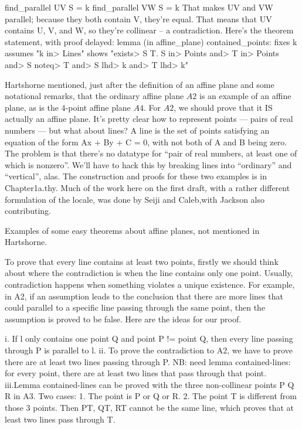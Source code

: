 \begin{isabellebody}
\begin{isamarkuptext}
find_parallel UV S = k
find_parallel VW S = k
That makes UV and VW parallel; because they both contain V, they're equal. That means that UV contains 
U, V, and W, so they're collinear -- a contradiction. 
Here's the theorem statement, with proof delayed:
lemma (in affine_plane) contained_points: 
  fixes k
  assumes "k \<in> Lines"
  shows "\<exists> S T. S \<in> Points \<and> T \<in> Points \<and>  S \<noteq> T \<and>  S \<lhd> k \<and>  T \<lhd> k"%
\end{isamarkuptext}\isamarkuptrue%
%
\isadelimdocument
%
\endisadelimdocument
%
\isatagdocument
%
\isamarkuptrue%
%
\endisatagdocument
{\isafolddocument}%
%
\isadelimdocument
%
\endisadelimdocument
%
\begin{isamarkuptext}%
Hartshorne mentioned, just after the definition of an affine plane and some notational
remarks, that the ordinary affine plane $A2$ is an example of an affine plane, as is the 4-point
affine plane $A4$. For $A2$, we should prove 
that it IS actually an affine plane. It's pretty clear how to represent points --- pairs of real 
numbers --- but what about lines? A line is the set of points satisfying an equation of 
the form Ax + By + C = 0, with not both of A and B being zero. The problem is that there's 
no datatype for ``pair of real numbers, at least one of which is nonzero''. We'll have 
to hack this by breaking lines into ``ordinary'' and ``vertical'', alas.  The construction
and proofs for these two examples is in Chapter1a.thy. Much of the work here 
on the first draft, with a rather different formulation of the locale, was done by Seiji and Caleb,with Jackson 
also contributing.%
\end{isamarkuptext}\isamarkuptrue%
%
\begin{isamarkuptext}%
\done \done  Examples of some easy theorems about affine planes, not mentioned in Hartshorne.
\jackson%
\end{isamarkuptext}\isamarkuptrue%
%
\begin{isamarkuptext}%
To prove that every line contains at least two points, firstly we should think about where the
contradiction is when the line contains only one point. Usually, contradiction happens when something
violates a unique existence. For example, in A2, if an assumption leads to the conclusion that there
are more lines that could parallel to a specific line passing through the same point, then the assumption
is proved to be false. Here are the ideas for our proof.

i. If l only contains one point Q and point P != point Q, then every line passing through P is parallel
to l.
ii. To prove the contradiction to A2, we have to prove there are at least two lines passing through P. 
NB: need lemma contained-lines: for every point, there are at least two lines that pass through that point.
iii.Lemma contained-lines can be proved with the three non-collinear points P Q R in A3. Two cases:
1. The point is P or Q or R. 2. The point T is different from those 3 points. Then PT, QT, RT cannot
be the same line, which proves that at least two lines pass through T.



\end{isamarkuptext}
\end{isabellebody}
